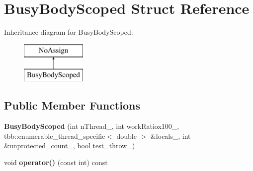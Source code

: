 \hypertarget{structBusyBodyScoped}{}\section{Busy\+Body\+Scoped Struct Reference}
\label{structBusyBodyScoped}
Inheritance diagram for Busy\+Body\+Scoped\+:\begin{figure}[H]
\begin{center}
\leavevmode
\includegraphics[height=2.000000cm]{structBusyBodyScoped}
\end{center}
\end{figure}
\subsection*{Public Member Functions}
\begin{DoxyCompactItemize}
\item 
\hypertarget{structBusyBodyScoped_a7f117ec93ccf2641dd6e263f2990e64f}{}{\bfseries Busy\+Body\+Scoped} (int n\+Thread\+\_\+, int work\+Ratiox100\+\_\+, tbb\+::enumerable\+\_\+thread\+\_\+specific$<$ double $>$ \&locals\+\_\+, int \&unprotected\+\_\+count\+\_\+, bool test\+\_\+throw\+\_\+)\label{structBusyBodyScoped_a7f117ec93ccf2641dd6e263f2990e64f}

\item 
\hypertarget{structBusyBodyScoped_abf65819bbe49aac3a928649e0eddd9a4}{}void {\bfseries operator()} (const int) const \label{structBusyBodyScoped_abf65819bbe49aac3a928649e0eddd9a4}

\end{DoxyCompactItemize}
